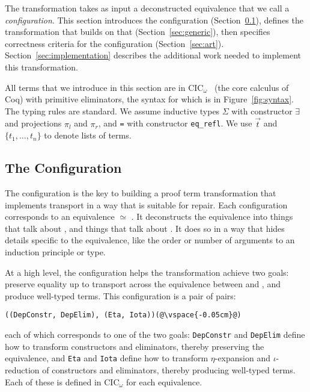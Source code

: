 
The transformation takes as input a deconstructed equivalence that we call a \textit{configuration}.
This section introduces the configuration (Section~\ref{sec:configurable}),
defines the transformation that builds on that (Section~\ref{sec:generic}),
then specifies correctness criteria for the configuration (Section~\ref{sec:art}).
Section~\ref{sec:implementation} describes the additional work needed to implement this transformation.

All terms that we introduce in this section are in CIC$_{\omega}$~\cite{coquand:inria-00076024, inductive} (the core calculus of Coq) with primitive eliminators,
the syntax for which is in Figure~\ref{fig:syntax}.
The typing rules are standard.
We assume inductive types $\Sigma$ with constructor $\exists$ and projections $\pi_l$ and $\pi_r$,
and \lstinline{=} with constructor \lstinline{eq_refl}.
We use $\vec{t}$ and $\{t_1, \ldots, t_n\}$ to denote lists of terms.

\subsection{The Configuration}
\label{sec:configurable}

The configuration is the key to building a proof term transformation that implements transport in a way that is suitable for repair.
Each configuration corresponds to an equivalence \A $\simeq$ \B.
It deconstructs the equivalence into things that talk about \A, and things that talk about \B.
It does so in a way that hides details
specific to the equivalence, like the order or number of arguments to an induction principle or type.

At a high level, the configuration helps the transformation achieve two goals: preserve equality up to transport across the equivalence 
between \A and \B, and produce well-typed terms.
This configuration is a pair of pairs:

\begin{lstlisting}
((DepConstr, DepElim), (Eta, Iota))(@\vspace{-0.05cm}@)
\end{lstlisting}
each of which corresponds to one of the two goals:
\lstinline{DepConstr} and \lstinline{DepElim} define how to transform constructors and eliminators, thereby preserving the equivalence, and 
\lstinline{Eta} and \lstinline{Iota} define how to transform $\eta$-expansion and $\iota$-reduction of constructors and eliminators, thereby producing well-typed terms.
Each of these is defined in CIC$_{\omega}$ for each equivalence.

